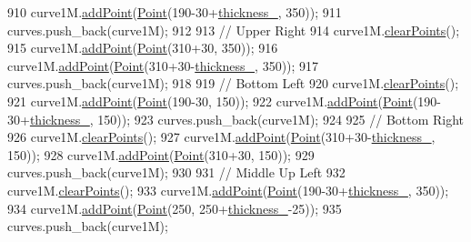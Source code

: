 \begin{DoxyCode}
910     curve1M.\mbox{\hyperlink{class_bezier_curve_a38d16c18b36ae45619b05e26e226cf34}{addPoint}}(\mbox{\hyperlink{class_point}{Point}}(190-30+\mbox{\hyperlink{class_font_v1_aed8040e76be9a52833627b92f0fb4e5f}{thickness\_}}, 350));
911     curves.push\_back(curve1M);
912 
913     \textcolor{comment}{// Upper Right}
914     curve1M.\mbox{\hyperlink{class_bezier_curve_a0ba8ce66d5af5971ae6a1b506029728e}{clearPoints}}();
915     curve1M.\mbox{\hyperlink{class_bezier_curve_a38d16c18b36ae45619b05e26e226cf34}{addPoint}}(\mbox{\hyperlink{class_point}{Point}}(310+30, 350));
916     curve1M.\mbox{\hyperlink{class_bezier_curve_a38d16c18b36ae45619b05e26e226cf34}{addPoint}}(\mbox{\hyperlink{class_point}{Point}}(310+30-\mbox{\hyperlink{class_font_v1_aed8040e76be9a52833627b92f0fb4e5f}{thickness\_}}, 350));
917     curves.push\_back(curve1M);
918 
919     \textcolor{comment}{// Bottom Left}
920     curve1M.\mbox{\hyperlink{class_bezier_curve_a0ba8ce66d5af5971ae6a1b506029728e}{clearPoints}}();
921     curve1M.\mbox{\hyperlink{class_bezier_curve_a38d16c18b36ae45619b05e26e226cf34}{addPoint}}(\mbox{\hyperlink{class_point}{Point}}(190-30, 150));
922     curve1M.\mbox{\hyperlink{class_bezier_curve_a38d16c18b36ae45619b05e26e226cf34}{addPoint}}(\mbox{\hyperlink{class_point}{Point}}(190-30+\mbox{\hyperlink{class_font_v1_aed8040e76be9a52833627b92f0fb4e5f}{thickness\_}}, 150));
923     curves.push\_back(curve1M);
924 
925     \textcolor{comment}{// Bottom Right}
926     curve1M.\mbox{\hyperlink{class_bezier_curve_a0ba8ce66d5af5971ae6a1b506029728e}{clearPoints}}();
927     curve1M.\mbox{\hyperlink{class_bezier_curve_a38d16c18b36ae45619b05e26e226cf34}{addPoint}}(\mbox{\hyperlink{class_point}{Point}}(310+30-\mbox{\hyperlink{class_font_v1_aed8040e76be9a52833627b92f0fb4e5f}{thickness\_}}, 150));
928     curve1M.\mbox{\hyperlink{class_bezier_curve_a38d16c18b36ae45619b05e26e226cf34}{addPoint}}(\mbox{\hyperlink{class_point}{Point}}(310+30, 150));
929     curves.push\_back(curve1M);
930 
931     \textcolor{comment}{// Middle Up Left}
932     curve1M.\mbox{\hyperlink{class_bezier_curve_a0ba8ce66d5af5971ae6a1b506029728e}{clearPoints}}();
933     curve1M.\mbox{\hyperlink{class_bezier_curve_a38d16c18b36ae45619b05e26e226cf34}{addPoint}}(\mbox{\hyperlink{class_point}{Point}}(190-30+\mbox{\hyperlink{class_font_v1_aed8040e76be9a52833627b92f0fb4e5f}{thickness\_}}, 350));
934     curve1M.\mbox{\hyperlink{class_bezier_curve_a38d16c18b36ae45619b05e26e226cf34}{addPoint}}(\mbox{\hyperlink{class_point}{Point}}(250, 250+\mbox{\hyperlink{class_font_v1_aed8040e76be9a52833627b92f0fb4e5f}{thickness\_}}-25));
935     curves.push\_back(curve1M);

\end{DoxyCode}

